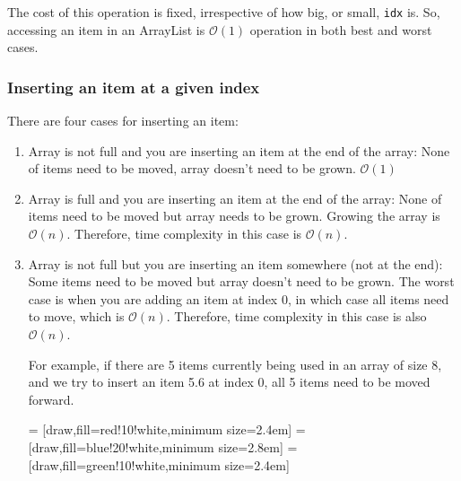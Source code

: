The cost of this operation is fixed, irrespective of how big, or small, \texttt{idx} is. So, accessing an item in an ArrayList is $\mathcal{O}(1)$ operation in both best and worst cases.

\subsubsection{Inserting an item at a given index}

There are four cases for inserting an item:

\begin{enumerate}

\item Array is not full and you are inserting an item at the end of the array: None of items need to be moved, array doesn't need to be grown. $\mathcal{O}(1)$
\item Array is full and you are inserting an item at the end of the array: None of items need to be moved but array needs to be grown. Growing the array is $\mathcal{O}(n)$. Therefore, time complexity in this case is $\mathcal{O}(n)$.
\item Array is not full but you are inserting an item somewhere (not at the end): Some items need to be moved but array doesn't need to be grown. The worst case is when you are adding an item at index 0, in which case all items need to move, which is $\mathcal{O}(n)$. Therefore, time complexity in this case is also $\mathcal{O}(n)$.

For example, if there are 5 items currently being used in an array of size 8, and we try to insert an item 5.6 at index 0, all 5 items need to be moved forward.

\bgroup \tikzset{png export}  \egroup

 = [draw,fill=red!10!white,minimum size=2.4em]
 = [draw,fill=blue!20!white,minimum size=2.8em]
 = [draw,fill=green!10!white,minimum size=2.4em]

\newcommand{\data}{{{12.5, 6.4, 8.5, 9.6, -3.4, 0, 0, 0},
					{12.5, 6.4, 8.5, 9.6, -3.4, -3.4, 0, 0},
					{12.5, 6.4, 8.5, 9.6, 9.6, -3.4, 0, 0},
					{12.5, 6.4, 8.5, 8.5, 9.6, -3.4, 0, 0},
					{12.5, 6.4, 6.4, 8.5, 9.6, -3.4, 0, 0},
					{12.5, 12.5, 6.4, 8.5, 9.6, -3.4, 0, 0},
					{6.4, 12.5, 6.4, 8.5, 9.6, -3.4, 0, 0}}}
					

\end{enumerate}

